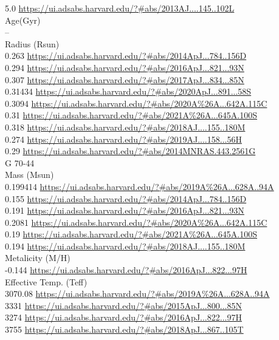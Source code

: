 5.0 \url{https://ui.adsabs.harvard.edu/?#abs/2013AJ....145..102L}\\
Age(Gyr)\\
--\\
Radius (Rsun)\\
0.263 \url{https://ui.adsabs.harvard.edu/?#abs/2014ApJ...784..156D}\\
0.294 \url{https://ui.adsabs.harvard.edu/?#abs/2016ApJ...821...93N}\\
0.307 \url{https://ui.adsabs.harvard.edu/?#abs/2017ApJ...834...85N}\\
0.31434 \url{https://ui.adsabs.harvard.edu/?#abs/2020ApJ...891...58S}\\
0.3094 \url{https://ui.adsabs.harvard.edu/?#abs/2020A%26A...642A.115C}\\
0.31 \url{https://ui.adsabs.harvard.edu/?#abs/2021A%26A...645A.100S}\\
0.318 \url{https://ui.adsabs.harvard.edu/?#abs/2018AJ....155..180M}\\
0.274 \url{https://ui.adsabs.harvard.edu/?#abs/2019AJ....158...56H}\\
0.29 \url{https://ui.adsabs.harvard.edu/?#abs/2014MNRAS.443.2561G}\\
G 70-44\\
Mass (Msun)\\
0.199414 \url{https://ui.adsabs.harvard.edu/?#abs/2019A%26A...628A..94A}\\
0.155 \url{https://ui.adsabs.harvard.edu/?#abs/2014ApJ...784..156D}\\
0.191 \url{https://ui.adsabs.harvard.edu/?#abs/2016ApJ...821...93N}\\
0.2081 \url{https://ui.adsabs.harvard.edu/?#abs/2020A%26A...642A.115C}\\
0.19 \url{https://ui.adsabs.harvard.edu/?#abs/2021A%26A...645A.100S}\\
0.194 \url{https://ui.adsabs.harvard.edu/?#abs/2018AJ....155..180M}\\
Metalicity (M/H)\\
-0.144 \url{https://ui.adsabs.harvard.edu/?#abs/2016ApJ...822...97H}\\
Effective Temp. (Teff)\\
3070.08 \url{https://ui.adsabs.harvard.edu/?#abs/2019A%26A...628A..94A}\\
3331 \url{https://ui.adsabs.harvard.edu/?#abs/2015ApJ...800...85N}\\
3274 \url{https://ui.adsabs.harvard.edu/?#abs/2016ApJ...822...97H}\\
3755 \url{https://ui.adsabs.harvard.edu/?#abs/2018ApJ...867..105T}\\
